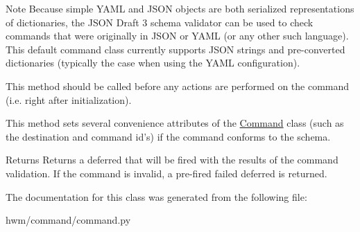 \begin{DoxyNote}{Note}
Because simple Y\-A\-M\-L and J\-S\-O\-N objects are both serialized representations of dictionaries, the J\-S\-O\-N Draft 3 schema validator can be used to check commands that were originally in J\-S\-O\-N or Y\-A\-M\-L (or any other such language). This default command class currently supports J\-S\-O\-N strings and pre-\/converted dictionaries (typically the case when using the Y\-A\-M\-L configuration). 

This method should be called before any actions are performed on the command (i.\-e. right after initialization). 

This method sets several convenience attributes of the \hyperlink{classhwm_1_1command_1_1command_1_1_command}{Command} class (such as the destination and command id's) if the command conforms to the schema.
\end{DoxyNote}
\begin{DoxyReturn}{Returns}
Returns a deferred that will be fired with the results of the command validation. If the command is invalid, a pre-\/fired failed deferred is returned. 
\end{DoxyReturn}


The documentation for this class was generated from the following file\-:\begin{DoxyCompactItemize}
\item 
hwm/command/command.\-py\end{DoxyCompactItemize}
